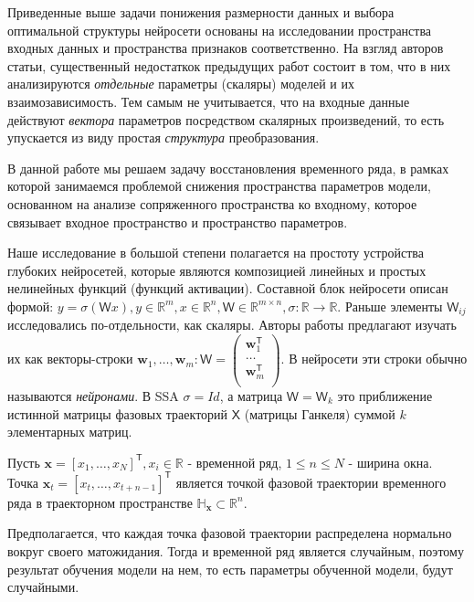 \documentclass[12pt, twoside]{article}
\begin{document}
Приведенные выше задачи понижения размерности данных и выбора оптимальной структуры нейросети основаны на исследовании пространства входных данных и пространства признаков соответственно. На взгляд авторов статьи, существенный недостаткок предыдущих работ состоит в том, что в них анализируются \textit{отдельные} параметры (скаляры) моделей и их взаимозависимость. Тем самым не учитывается, что на входные данные действуют \textit{вектора} параметров посредством скалярных произведений, то есть упускается из виду простая \textit{структура} преобразования.

В данной работе мы решаем задачу восстановления временного ряда, в рамках которой занимаемся проблемой снижения пространства параметров модели, основанном на анализе сопряженного пространства ко входному, которое связывает входное пространство и пространство параметров. 

Наше исследование в большой степени полагается на простоту устройства глубоких нейросетей, которые являются композицией линейных и простых нелинейных функций (функций активации). Составной блок нейросети описан формой:  $y=\sigma(\mathsf{W}x), y \in \mathbb{R}^m, x \in \mathbb{R}^n, \mathsf{W} \in \mathbb{R}^{m \times n}, \sigma: \mathbb{R} \to \mathbb{R}$. Раньше элементы $\mathsf{W}_{ij}$ исследовались по-отдельности, как скаляры. Авторы работы предлагают изучать их как векторы-строки $\mathbf{w}_1, \dots, \mathbf{w}_m: \mathsf{W} = \begin{pmatrix}
\mathbf{w}_1^{\mathsf{T}}\\
\dots\\
\mathbf{w}_m^{\mathsf{T}}\\
\end{pmatrix}$. В нейросети эти строки обычно называются \textit{нейронами}. В SSA $\sigma = Id$, а матрица $\mathsf{W}=\mathsf{W}_k$ это приближение истинной матрицы фазовых траекторий $\mathsf{X}$ (матрицы Ганкеля) суммой $k$ элементарных матриц.


Пусть $\mathbf{x} = [x_1, \dots, x_N]^{\mathsf{T}}, x_i \in \mathbb{R}$ - временной ряд, $1 \le n \le N$ - ширина окна. Точка $\mathbf{x}_t = [x_t, \dots, x_{t + n - 1}]^{\mathsf{T}}$ является точкой фазовой траектории временного ряда в траекторном пространстве $\mathbb{H}_{\mathbf{x}} \subset \mathbb{R}^n$. 

Предполагается, что каждая точка фазовой траектории распределена нормально вокруг своего матожидания. Тогда и временной ряд является случайным, поэтому результат обучения модели на нем, то есть параметры обученной модели, будут случайными.
\end{document}
